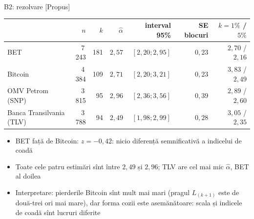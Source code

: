 \ifsolutions
\begin{frame}{B2: rezolvare [Propus]}
\itemsize{\footnotesize}
\begin{center}
\footnotesize
\begin{tabular}{lrrrrrr}
\toprule
& $n$ & $k$ & $\hat\alpha$ & interval 95\% & SE blocuri & $k = 1\%$ / $5\%$ \\
\midrule
BET & 7\,243 & 181 & $2{,}57$ & $[2{,}20; 2{,}95]$ & $0{,}23$ & $2{,}70$ / $2{,}16$ \\
Bitcoin & 4\,384 & 109 & $2{,}71$ & $[2{,}20; 3{,}21]$ & $0{,}23$ & $3{,}83$ / $2{,}49$ \\
OMV Petrom (SNP) & 3\,815 & 95 & $2{,}96$ & $[2{,}36; 3{,}56]$ & $0{,}39$ & $2{,}89$ / $2{,}60$ \\
Banca Transilvania (TLV) & 3\,788 & 94 & $2{,}49$ & $[1{,}98; 2{,}99]$ & $0{,}28$ & $3{,}05$ / $2{,}35$ \\
\bottomrule
\end{tabular}
\end{center}
\begin{itemize}
    \item BET față de Bitcoin: $z = -0{,}42$: nicio diferență semnificativă a indicelui de coadă
    \item Toate cele patru estimări sînt între $2{,}49$ și $2{,}96$; TLV are cel mai mic $\hat\alpha$, BET al doilea
    \item Interpretare: pierderile Bitcoin sînt mult mai mari (pragul $L_{(k+1)}$ este de două-trei ori mai mare), dar forma cozii este asemănătoare: scala și indicele de coadă sînt lucruri diferite
\end{itemize}
\end{frame}
\fi

